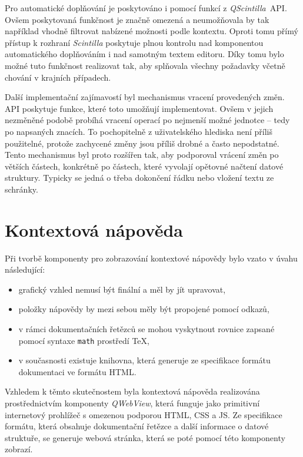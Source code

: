 \documentclass[FM,bw,DP]{tulthesis}
\begin{document}
Pro automatické doplňování je poskytováno i pomocí funkcí z \textit{QScintilla}~\gls{API}. Ovšem poskytovaná funkčnost je značně omezená a neumožňovala by tak například vhodně filtrovat nabízené možnosti podle kontextu. Oproti tomu přímý přístup k rozhraní \textit{Scintilla} poskytuje plnou kontrolu nad komponentou automatického doplňováním i nad samotným textem editoru. Díky tomu bylo možné tuto funkčnost realizovat tak, aby splňovala všechny požadavky včetně chování v krajních případech.

Další implementační zajímavostí byl mechanismus vracení provedených změn. \gls{API} poskytuje funkce, které toto umožňují implementovat. Ovšem v jejich nezměněné podobě probíhá vracení operací po nejmenší možné jednotce -- tedy po napsaných znacích. To pochopitelně z uživatelského hlediska není příliš použitelné, protože zachycené změny jsou příliš drobné a často nepodstatné. Tento mechanismus byl proto rozšířen tak, aby podporoval vrácení změn po větších částech, konkrétně po částech, které vyvolají opětovné načtení datové struktury. Typicky se jedná o třeba dokončení řádku nebo vložení textu ze schránky.

\section{Kontextová nápověda}

Při tvorbě komponenty pro zobrazování kontextové nápovědy bylo vzato v úvahu následující:

\begin{itemize}
\item grafický vzhled nemusí být finální a měl by jít upravovat,
\item položky nápovědy by mezi sebou měly být propojené pomocí odkazů,
\item v rámci dokumentačních řetězců se mohou vyskytnout rovnice zapsané pomocí syntaxe \texttt{math} prostředí \TeX,
\item v současnosti existuje knihovna, která generuje ze specifikace formátu dokumentaci ve formátu \gls{HTML}.
\end{itemize}

Vzhledem k těmto skutečnostem byla kontextová nápověda realizována pro\-střed\-nictvím komponenty \textit{QWebView}, která funguje jako primitivní internetový prohlížeč s omezenou podporou \gls{HTML}, \gls{CSS} a \gls{JS}. Ze specifikace formátu, která obsahuje dokumentační řetězce a další informace o datové struktuře, se generuje webová stránka, která se poté pomocí této komponenty zobrazí.
\end{document}
